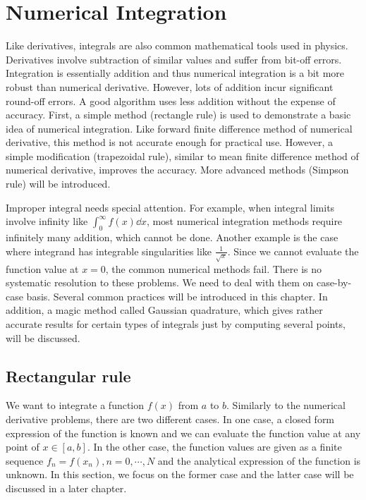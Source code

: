 \chapter{Numerical Integration}\label{ch:integrals}


Like derivatives, integrals are also common mathematical tools used in physics.  Derivatives involve subtraction of similar values and suffer from bit-off errors.  Integration is essentially addition and thus numerical integration is a bit more robust than numerical derivative.  However, lots of addition incur significant round-off errors.  A good algorithm uses less addition without the expense of accuracy.  First, a simple method (rectangle rule) is used to demonstrate a basic idea of numerical integration.  Like forward finite difference method of numerical derivative, this method is not accurate enough for practical use.  However, a simple modification (trapezoidal rule), similar to mean finite difference method of numerical derivative, improves the accuracy.  More advanced methods (Simpson rule) will be introduced.

Improper integral needs special attention.   For example, when integral limits involve infinity like $\displaystyle\int_0^\infty f(x) \dd{x}$,  most numerical integration methods require infinitely many addition, which cannot be done.  Another example is the case where integrand has integrable singularities like $\displaystyle\frac{1}{\sqrt{x}}$.  Since we cannot evaluate the function value at $x=0$, the common numerical methods fail.  There is no systematic resolution to these problems.  We need to deal with them on case-by-case basis.  Several common practices will be introduced in this chapter.
In addition, a magic method called Gaussian quadrature, which gives rather accurate results for certain types of integrals just by computing several points, will be discussed.

\section{Rectangular rule}\label{sec:rectangular-rule}
	
We want to integrate a function $f(x)$ from $a$ to $b$.
Similarly to the numerical derivative problems, there are two different cases.  In one case, a closed form expression of the function is known and we can evaluate the function value at any point of $x \in [a,b]$.  In the other case, the function values are given as a finite sequence $f_n = f(x_n), n=0, \cdots, N$ and the analytical expression of the function is unknown. In this section, we focus on the former case and the latter case will be discussed in a later chapter.

